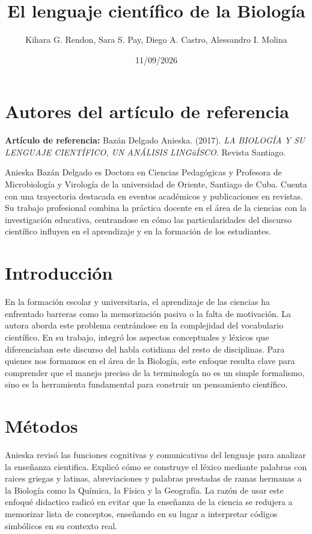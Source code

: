 \documentclass[12pt]{article}
\title{El lenguaje científico de la Biología}
\author{Kihara G. Rendon, Sara S. Pay, Diego A. Castro, Alessandro I. Molina}
\date{11/09/2026}
\begin{document}
\maketitle
\section{Autores del artículo de referencia}
\textbf{Artículo de referencia:} Bazán Delgado Anieska. (2017). \textit{LA BIOLOGÍA Y SU LENGUAJE CIENTÍFICO, UN ANÁLISIS LINGüÍSCO}. Revista Santiago.

Anieska Bazán Delgado es Doctora en Ciencias Pedagógicas y Profesora de Microbiología y Virología de la universidad de Oriente, Santiago de Cuba. Cuenta con una trayectoria destacada en eventos académicos y publicaciones en revistas. Su trabajo profesional combina la práctica docente en el área de la ciencias con la investigación educativa, centrandose en cómo las particularidades del discurso científico influyen en el aprendizaje y en la formación de los estudiantes.

\section{Introducción}
En la formación escolar y universitaria, el aprendizaje de las ciencias ha enfrentado barreras como la memorización pasiva o la falta de motivación. La autora aborda este problema centrándose en la complejidad del vocabulario científico. En su trabajo, integró los aspectos conceptuales y léxicos que diferenciaban este discurso del habla cotidiana del resto de disciplinas. Para quienes nos formamos en el área de la Biología, este enfoque resulta clave para comprender que el manejo preciso de la terminología no es un simple formalismo, sino es la herramienta fundamental para construir un pensamiento científico.

\section{Métodos}
Anieska revisó las funciones cognitivas y comunicativas del lenguaje para analizar la enseñanza cientifica. Explicó cómo se construye el léxico mediante palabras con raices griegas y latinas, abreviaciones y palabras prestadas de ramas hermanas a la Biología como la Química, la Física y la Geografía. La razón de usar este enfoqué didactico radicó en evitar que la enseñanza de la ciencia se redujera a memorizar lista de conceptos, enseñando en su lugar a interpretar códigos simbólicos en su contexto real.
\end{document}

